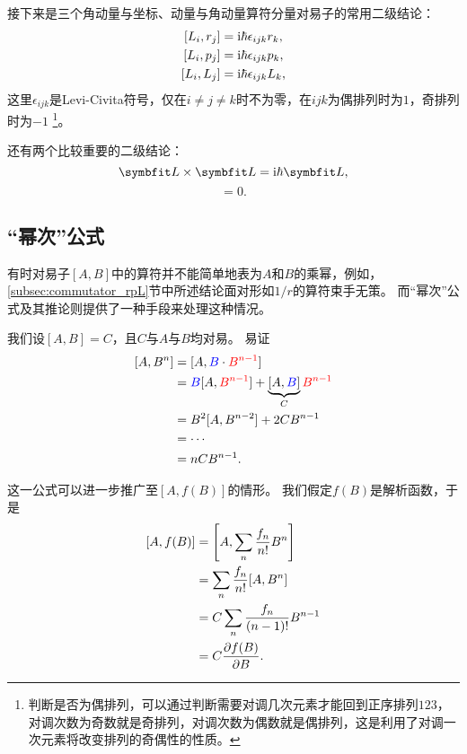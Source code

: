 接下来是三个角动量与坐标、动量与角动量算符分量对易子的常用二级结论：
\begin{equation}
    \begin{aligned}
        \relax
        [L_i, r_j] &= \mathrm{i}\hbar\epsilon_{ijk} r_k, \\
        [L_i, p_j] &= \mathrm{i}\hbar\epsilon_{ijk} p_k, \\
        [L_i, L_j] &= \mathrm{i}\hbar\epsilon_{ijk} L_k,
    \end{aligned}
\end{equation}
这里$\epsilon_{ijk}$是Levi-Civita符号，仅在$i\ne j\ne k$时不为零，在$ijk$为偶排列时为$1$，奇排列时为$-1$
\footnote{判断是否为偶排列，可以通过判断需要对调几次元素才能回到正序排列$123$，对调次数为奇数就是奇排列，对调次数为偶数就是偶排列，这是利用了对调一次元素将改变排列的奇偶性的性质。}。

还有两个比较重要的二级结论：
\begin{equation}
    \LL\times\LL = \ii\hbar\LL,
\end{equation}
\begin{equation}
    [\LL^2, L_i] = 0.
\end{equation}


\subsection{``幂次''公式}

有时对易子$[A,B]$中的算符并不能简单地表为$A$和$B$的乘幂，例如，\ref{subsec:commutator_rpL}节中所述结论面对形如$1/r$的算符束手无策。
而``幂次''公式及其推论则提供了一种手段来处理这种情况。

我们设$[A, B] = C$，且$C$与$A$与$B$均对易。
易证
\begin{equation}
\begin{aligned}
    \relax
    [A,B^n]
    &= [A,\textcolor{blue}{B}\cdot \textcolor{red}{B^{n-1}}] \\
    &= \textcolor{blue}{B} [A, \textcolor{red}{B^{n-1}}] + \underbrace{[A, \textcolor{blue}{B}]}_C \textcolor{red}{B^{n-1}} \\
    &= B^2 [A, B^{n-2}] + 2C B^{n-1} \\
    &= \cdots \\
    &= n C B^{n-1}.
\end{aligned}
\end{equation}

这一公式可以进一步推广至$[A,f(B)]$的情形。
我们假定$f(B)$是解析函数，于是
\begin{equation}
\begin{aligned}
    \relax
    [A,f(B)]
    &= \left[A, \sum_n \frac{f_n}{n!} B^n\right] \\
    &= \sum_n \frac{f_n}{n!} [A, B^n] \\
    &= C \sum_n \frac{f_n}{(n-1)!} B^{n-1} \\
    &= C \frac{\partial f(B)}{\partial B}.
\end{aligned}
\end{equation}

